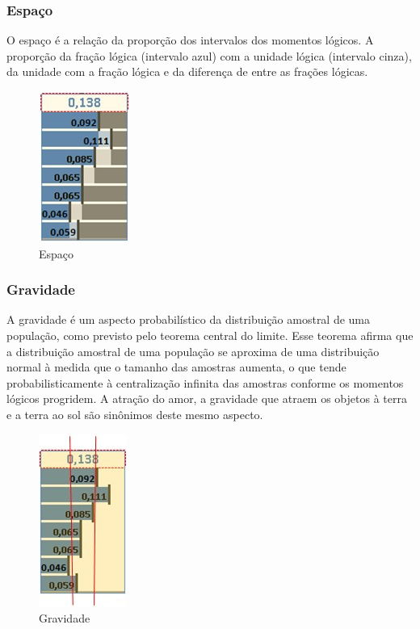 \subsubsection{Espaço}
O espaço é a relação da proporção dos intervalos dos momentos lógicos. A proporção da fração lógica (intervalo azul) com a unidade lógica (intervalo cinza), da unidade com a fração lógica e da diferença de entre as frações lógicas.

\begin{figure}[H]
\caption{Espaço}
\label{fig:consciousness_space}
\centering
\includegraphics[scale=1]{sections/images/consciousness_space.jpg}
\end{figure}

\subsubsection{Gravidade}
A gravidade é um aspecto probabilístico da distribuição amostral de uma população, como previsto pelo teorema central do limite. Esse teorema afirma que a distribuição amostral de uma população se aproxima de uma distribuição normal à medida que o tamanho das amostras aumenta, o que tende probabilisticamente à centralização infinita das amostras conforme os momentos lógicos progridem. A atração do amor, a gravidade que atraem os objetos à terra e a terra ao sol são sinônimos deste mesmo aspecto.

\begin{figure}[H]
\caption{Gravidade}
\label{fig:consciousness_gravity}
\centering
\includegraphics[scale=1]{sections/images/consciousness_gravity.jpg}
\end{figure}

